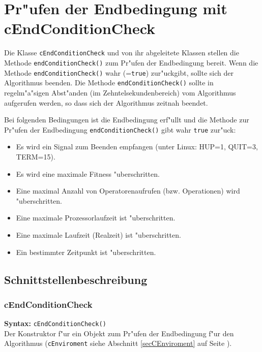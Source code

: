 \section{Pr"ufen der Endbedingung mit cEndConditionCheck}
\label{secEndConditionCheck}

Die Klasse \verb|cEndConditionCheck| und von ihr abgeleitete Klassen stellen die Methode \verb|endConditionCheck()| zum Pr"ufen der Endbedingung bereit. Wenn die Methode \verb|endConditionCheck()| wahr (=\verb|true|) zur"uckgibt, sollte sich der Algorithmus beenden. Die Methode  \verb|endConditionCheck()| sollte in regelm"a"sigen Abst"anden (im Zehntelsekundenbereich) vom Algorithmus aufgerufen werden, so dass sich der Algorithmus zeitnah beendet.

\bigskip\noindent
Bei folgenden Bedingungen ist die Endbedingung erf"ullt und die Methode zur Pr"ufen der Endbedingung \verb|endConditionCheck()| gibt wahr \verb|true| zur"uck:
\begin{itemize}
 \item Es wird ein Signal zum Beenden empfangen (unter Linux: HUP=1, QUIT=3, TERM=15).
 \item Es wird eine maximale Fitness "uberschritten.
 \item Eine maximal Anzahl von Operatorenaufrufen (bzw. Operationen) wird "uberschritten.
 \item Eine maximale Prozessorlaufzeit ist "uberschritten.
 \item Eine maximale Laufzeit (Realzeit) ist "uberschritten.
 \item Ein bestimmter Zeitpunkt ist "uberschritten.
\end{itemize}


\subsection{Schnittstellenbeschreibung}


\subsubsection{cEndConditionCheck}

\textbf{Syntax:} \verb|cEndConditionCheck()| \\

Der Konstruktor f"ur ein Objekt zum Pr"ufen der Endbedingung f"ur den Algorithmus (\verb|cEnviroment| siehe Abschnitt \ref{secCEnviroment} auf Seite \pageref{secCEnviroment}).

